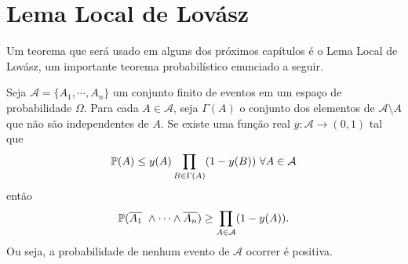 






\section{Lema Local de Lovász}

Um teorema que será usado em alguns dos próximos capítulos é o Lema Local de Lovász, um importante teorema probabilístico enunciado a seguir.

\begin{teorema}\label{LLL}
Seja $\mathcal{A} = \{A_1, \cdots, A_n\}$ um conjunto finito de eventos em um espaço de probabilidade $\Omega$. Para cada $A\in \mathcal{A}$, seja $\Gamma(A)$ o conjunto dos elementos de $\mathcal{A}\setminus A$ que não são independentes de $A$. Se existe uma função real $y : \mathcal{A} \rightarrow (0,1)$ tal que
\[\mathbb{P}(A)\leq y(A) \prod_{B\in \Gamma(A)}(1-y(B))\ \forall A\in \mathcal{A}\]
então 
\[\mathbb{P}(\overline{A_1}\ \wedge \cdots \wedge \overline{A_n}) \geq \prod_{A\in\mathcal{A}}(1-y(A)).\]
Ou seja, a probabilidade de nenhum evento de $\mathcal{A}$ ocorrer é positiva.
\end{teorema}

